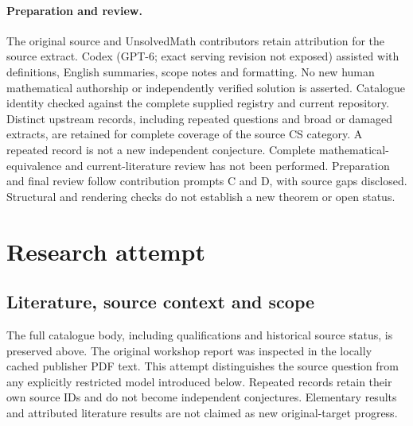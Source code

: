 \documentclass[11pt]{article}
\begin{document}
\paragraph{Preparation and review.}
The original source and UnsolvedMath contributors retain attribution for the source extract. Codex (GPT-6; exact serving revision not exposed) assisted with definitions, English summaries, scope notes and formatting. No new human mathematical authorship or independently verified solution is asserted. Catalogue identity checked against the complete supplied registry and current repository. Distinct upstream records, including repeated questions and broad or damaged extracts, are retained for complete coverage of the source CS category. A repeated record is not a new independent conjecture. Complete mathematical-equivalence and current-literature review has not been performed. Preparation and final review follow contribution prompts C and D, with source gaps disclosed. Structural and rendering checks do not establish a new theorem or open status.
\label{end:statement}

\section{Research attempt}
\subsection{Literature, source context and scope}
The full catalogue body, including qualifications and historical source status, is preserved above. The original workshop report was inspected in the locally cached publisher PDF text. This attempt distinguishes the source question from any explicitly restricted model introduced below. Repeated records retain their own source IDs and do not become independent conjectures. Elementary results and attributed literature results are not claimed as new original-target progress.
\end{document}
